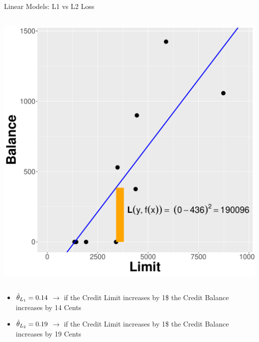 \documentclass[11pt,compress,t,notes=noshow, xcolor=table]{beamer}
\begin{document}
\begin{vbframe}{Linear Models: L1 vs L2 Loss}
\begin{columns}
\begin{column}{0.5\textwidth}
\begin{center}
  \includegraphics[width = \textwidth]{slides/supervised-regression/figure/nutshell-regression-L2-regr-line.pdf}
\end{center}
\end{column}
\end{columns}
\begin{minipage}[t]{0.5\textwidth}
    \footnotesize
    \begin{itemize}
        \item \small $\hat{\theta}_{L_1} = 0.14$ $\rightarrow$ if the Credit Limit increases by 1\$ the Credit Balance increases by 14 Cents 
    \end{itemize}
\end{minipage}
\hfill
\begin{minipage}[t]{0.48\textwidth}
    \footnotesize
    \begin{itemize}
        \item \small $\hat{\theta}_{L_2} = 0.19$ $\rightarrow$ if the Credit Limit increases by 1\$ the Credit Balance increases by 19 Cents
    \end{itemize}
\end{minipage}


\end{vbframe}
\end{document}
